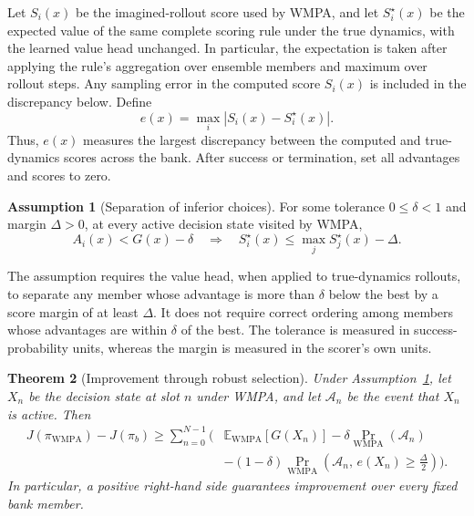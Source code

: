 \documentclass{article}
\theoremstyle{plain}
\newtheorem{wmpatheorem}{Theorem}[section]
\theoremstyle{definition}
\newtheorem{wmpaassumption}[wmpatheorem]{Assumption}
\theoremstyle{plain}
\newcommand{\wmpa}{\textsc{WMPA}}
\begin{document}
Let $S_i(x)$ be the imagined-rollout score used by \wmpa{}, and let
$S_i^\star(x)$ be the expected value of the same complete scoring rule
under the true dynamics, with the learned value head unchanged. In
particular, the expectation is taken after applying the rule's
aggregation over ensemble members and maximum over rollout steps. Any
sampling error in the computed score $S_i(x)$ is included in the
discrepancy below. Define
\begin{equation}
    e(x)=\max_i\left|S_i(x)-S_i^\star(x)\right|.
    \label{eq:wmpa_score_discrepancy}
\end{equation}
Thus, $e(x)$ measures the largest discrepancy between the computed and
true-dynamics scores across the bank. After success or termination, set all
advantages and scores to zero.

\begin{wmpaassumption}[Separation of inferior choices]
\label{ass:wmpa_score_separation}
For some tolerance $0\leq\delta<1$ and margin $\Delta>0$, at every
active decision state visited by \wmpa{},
\begin{equation}
    A_i(x)<G(x)-\delta
    \quad\Longrightarrow\quad
    S_i^\star(x)\leq\max_j S_j^\star(x)-\Delta.
    \label{eq:wmpa_score_separation}
\end{equation}
\end{wmpaassumption}

The assumption requires the value head, when applied to true-dynamics
rollouts, to separate any member whose advantage is more than $\delta$
below the best by a score margin of at least $\Delta$. It does not require
correct ordering among members whose advantages are within $\delta$ of
the best. The tolerance is measured in success-probability units, whereas
the margin is measured in the scorer's own units.

\begin{wmpatheorem}[Improvement through robust selection]
\label{thm:wmpa_robust_selection}
Under Assumption~\ref{ass:wmpa_score_separation}, let $X_n$ be the decision
state at slot $n$ under \wmpa{}, and let $\mathcal A_n$ be the event that
$X_n$ is active. Then
\begin{equation}
\begin{split}
    J(\pi_{\mathrm{WMPA}})-J(\pi_b)
    \geq \sum_{n=0}^{N-1}
    \biggl(&\mathbb E_{\mathrm{WMPA}}[G(X_n)]
    -\delta\Pr_{\mathrm{WMPA}}(\mathcal A_n)\\
    &-(1-\delta)\Pr_{\mathrm{WMPA}}\!\left(
        \mathcal A_n,\,
        e(X_n)\geq\frac{\Delta}{2}\right)\biggr).
\end{split}
\label{eq:wmpa_robust_improvement}
\end{equation}
In particular, a positive right-hand side guarantees improvement over
every fixed bank member.
\end{wmpatheorem}
\end{document}
